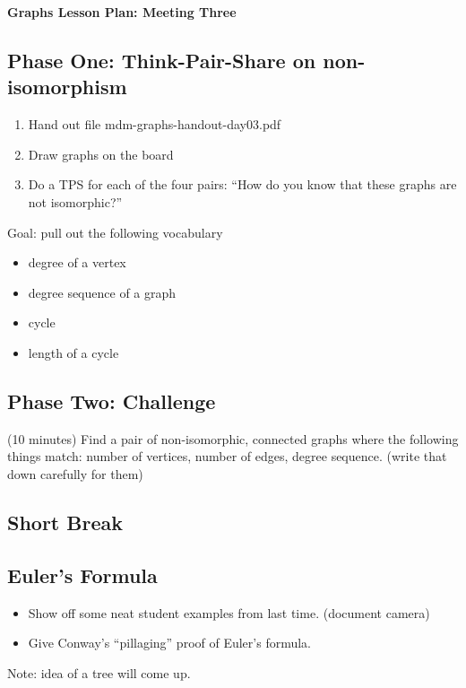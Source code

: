 \documentclass[12pt]{amsart}
\theoremstyle{definition}
\begin{document}
\begin{center}
\textbf{\Huge
Graphs Lesson Plan: Meeting Three
}
\end{center}
\vspace{.5in}

\subsection*{Phase One: Think-Pair-Share on non-isomorphism}

\begin{enumerate}
\item Hand out file mdm-graphs-handout-day03.pdf
\item Draw graphs on the board
\item Do a TPS for each of the four pairs: ``How do you know that these graphs are not isomorphic?''
\end{enumerate}

Goal: pull out the following vocabulary
\begin{itemize}
\item degree of a vertex
\item degree sequence of a graph
\item cycle
\item length of a cycle
\end{itemize}

\subsection*{Phase Two: Challenge}

(10 minutes) Find a pair of non-isomorphic, connected graphs where the following things match: number of vertices, number of edges, degree sequence. (write that down carefully for them)

\subsection*{Short Break}

\subsection*{Euler's Formula}

\begin{itemize}
\item Show off some neat student examples from last time. (document camera)
\item Give Conway's ``pillaging'' proof of Euler's formula.
\end{itemize}

Note: idea of a tree will come up. 
\end{document}
